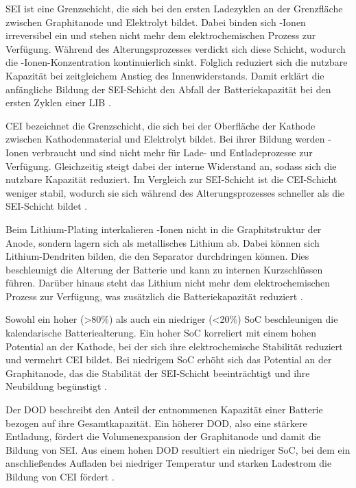 \par
\acs{SEI} ist eine Grenzschicht, die sich bei den ersten Ladezyklen an der Grenzfläche zwischen Graphitanode und Elektrolyt bildet. Dabei binden sich -Ionen irreversibel ein und stehen nicht mehr dem elektrochemischen Prozess zur Verfügung. Während des Alterungsprozesses verdickt sich diese Schicht, wodurch die -Ionen-Konzentration kontinuierlich sinkt. Folglich reduziert sich die nutzbare Kapazität bei zeitgleichem Anstieg des Innenwiderstands. Damit erklärt die anfängliche Bildung der SEI-Schicht den Abfall der Batteriekapazität bei den ersten Zyklen einer \acs{LIB} \cite{urlIdBatterieAlterungSEI}.
\par
\acs{CEI} bezeichnet die Grenzschicht, die sich bei der Oberfläche der Kathode zwischen Kathodenmaterial und Elektrolyt bildet. Bei ihrer Bildung werden -Ionen verbraucht und sind nicht mehr für Lade- und Entladeprozesse zur Verfügung. Gleichzeitig steigt dabei der interne Widerstand an, sodass sich die nutzbare Kapazität reduziert. Im Vergleich zur \acs{SEI}-Schicht ist die \acs{CEI}-Schicht weniger stabil, wodurch sie sich während des Alterungsprozesses schneller als die \acs{SEI}-Schicht bildet \cite{urlIdBatterieAlterungCEI}.
\par
Beim Lithium-Plating interkalieren -Ionen nicht in die Graphitstruktur der Anode, sondern lagern sich als metallisches Lithium ab. Dabei können sich Lithium-Dendriten bilden, die den Separator durchdringen können. Dies beschleunigt die Alterung der Batterie und kann zu internen Kurzschlüssen führen. Darüber hinaus steht das Lithium nicht mehr dem elektrochemischen Prozess zur Verfügung, was zusätzlich die Batteriekapazität reduziert \cite{urlIdBatterieAlterungLithiumPlating}.
\par
Sowohl ein hoher (\textgreater 80\%) als auch ein niedriger (\textless 20\%) \acs{SoC} beschleunigen die kalendarische Batteriealterung. Ein hoher \acs{SoC} korreliert mit einem hohen Potential an der Kathode, bei der sich ihre elektrochemische Stabilität reduziert und vermehrt \acs{CEI} bildet. Bei niedrigem \acs{SoC} erhöht sich das Potential an der Graphitanode, das die Stabilität der \acs{SEI}-Schicht beeinträchtigt und ihre Neubildung begünstigt \cite{urlIdBatterieAlterungVerschiedenerSoCLithiumBatterien}.
\par
Der \acs{DOD} beschreibt den Anteil der entnommenen Kapazität einer Batterie bezogen auf ihre Gesamtkapazität. Ein höherer \acs{DOD}, also eine stärkere Entladung, fördert die Volumenexpansion der Graphitanode und damit die Bildung von \acs{SEI}. Aus einem hohen \acs{DOD} resultiert ein niedriger \acs{SoC}, bei dem ein anschließendes Aufladen bei niedriger Temperatur und starken Ladestrom die Bildung von \acs{CEI} fördert \cite{urlIdAlterungDOD}.

